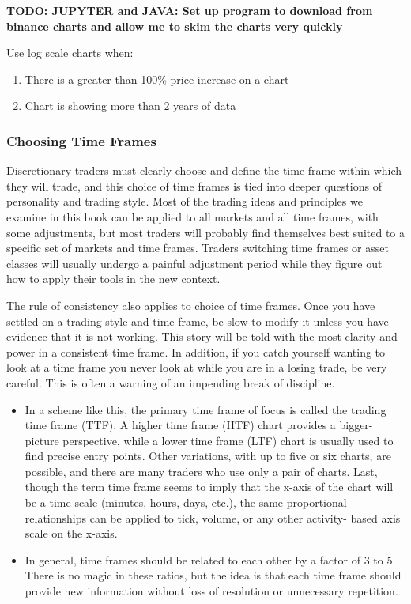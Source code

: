 \documentclass[10pt,twocolumn]{article}
\begin{document}
\textbf{TODO: JUPYTER and JAVA: Set up program to download from binance charts and allow me to skim the charts very quickly}

Use log scale charts when:
\begin{enumerate}
  \item There is a greater than 100\% price increase on a chart
  \item Chart is showing more than 2 years of data
\end{enumerate}

\subsubsection{Choosing Time Frames}
Discretionary traders must clearly choose and define the time frame within which they will trade, and this choice of time frames is tied into deeper questions of personality and trading style. Most of the trading ideas and principles we examine in this book can be applied to all markets and all time frames, with some adjustments, but most traders will probably find themselves best suited to a specific set of markets and time frames. Traders switching time frames or asset classes will usually undergo a painful adjustment period while they figure out how to apply their tools in the new context.

The rule of consistency also applies to choice of time frames. Once you have settled on a trading style and time frame, be slow to modify it unless you have evidence that it is not working. This story will be told with the most clarity and power in a consistent time frame. In addition, if you catch yourself wanting to look at a time frame you never look at while you are in a losing trade, be very careful. This is often a warning of an impending break of discipline.

\begin{itemize}
  \item In a scheme like this, the primary time frame of focus is called the trading time frame (TTF). A higher time frame (HTF) chart provides a bigger- picture perspective, while a lower time frame (LTF) chart is usually used to find precise entry points. Other variations, with up to five or six charts, are possible, and there are many traders who use only a pair of charts. Last, though the term time frame seems to imply that the x-axis of the chart will be a time scale (minutes, hours, days, etc.), the same proportional relationships can be applied to tick, volume, or any other activity- based axis scale on the x-axis.
  \item In general, time frames should be related to each other by a factor of 3 to 5. There is no magic in these ratios, but the idea is that each time frame should provide new information without loss of resolution or unnecessary repetition.
\end{itemize}
\end{document}
